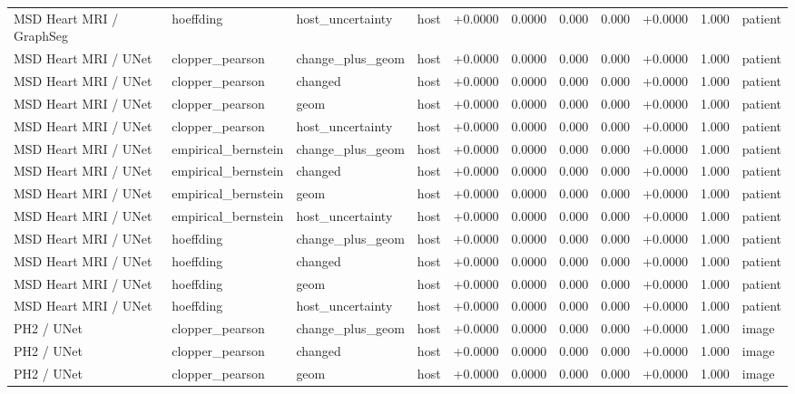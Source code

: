 \begin{table}[t]
\begin{tabular}{lllllllllll}
MSD Heart MRI / GraphSeg & hoeffding & host\_uncertainty & host & +0.0000 & 0.0000 & 0.000 & 0.000 & +0.0000 & 1.000 & patient \\
MSD Heart MRI / UNet & clopper\_pearson & change\_plus\_geom & host & +0.0000 & 0.0000 & 0.000 & 0.000 & +0.0000 & 1.000 & patient \\
MSD Heart MRI / UNet & clopper\_pearson & changed & host & +0.0000 & 0.0000 & 0.000 & 0.000 & +0.0000 & 1.000 & patient \\
MSD Heart MRI / UNet & clopper\_pearson & geom & host & +0.0000 & 0.0000 & 0.000 & 0.000 & +0.0000 & 1.000 & patient \\
MSD Heart MRI / UNet & clopper\_pearson & host\_uncertainty & host & +0.0000 & 0.0000 & 0.000 & 0.000 & +0.0000 & 1.000 & patient \\
MSD Heart MRI / UNet & empirical\_bernstein & change\_plus\_geom & host & +0.0000 & 0.0000 & 0.000 & 0.000 & +0.0000 & 1.000 & patient \\
MSD Heart MRI / UNet & empirical\_bernstein & changed & host & +0.0000 & 0.0000 & 0.000 & 0.000 & +0.0000 & 1.000 & patient \\
MSD Heart MRI / UNet & empirical\_bernstein & geom & host & +0.0000 & 0.0000 & 0.000 & 0.000 & +0.0000 & 1.000 & patient \\
MSD Heart MRI / UNet & empirical\_bernstein & host\_uncertainty & host & +0.0000 & 0.0000 & 0.000 & 0.000 & +0.0000 & 1.000 & patient \\
MSD Heart MRI / UNet & hoeffding & change\_plus\_geom & host & +0.0000 & 0.0000 & 0.000 & 0.000 & +0.0000 & 1.000 & patient \\
MSD Heart MRI / UNet & hoeffding & changed & host & +0.0000 & 0.0000 & 0.000 & 0.000 & +0.0000 & 1.000 & patient \\
MSD Heart MRI / UNet & hoeffding & geom & host & +0.0000 & 0.0000 & 0.000 & 0.000 & +0.0000 & 1.000 & patient \\
MSD Heart MRI / UNet & hoeffding & host\_uncertainty & host & +0.0000 & 0.0000 & 0.000 & 0.000 & +0.0000 & 1.000 & patient \\
PH2 / UNet & clopper\_pearson & change\_plus\_geom & host & +0.0000 & 0.0000 & 0.000 & 0.000 & +0.0000 & 1.000 & image \\
PH2 / UNet & clopper\_pearson & changed & host & +0.0000 & 0.0000 & 0.000 & 0.000 & +0.0000 & 1.000 & image \\
PH2 / UNet & clopper\_pearson & geom & host & +0.0000 & 0.0000 & 0.000 & 0.000 & +0.0000 & 1.000 & image \\

\end{tabular}
\end{table}
